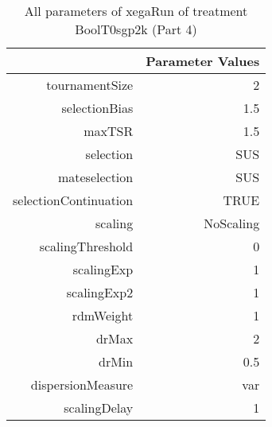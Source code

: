 \begin{table}[ht]
\centering
\begin{tabular}{rr}
  \hline
 & Parameter Values \\ 
  \hline
tournamentSize & 2 \\ 
  selectionBias & 1.5 \\ 
  maxTSR & 1.5 \\ 
  selection & SUS \\ 
  mateselection & SUS \\ 
  selectionContinuation & TRUE \\ 
  scaling & NoScaling \\ 
  scalingThreshold & 0 \\ 
  scalingExp & 1 \\ 
  scalingExp2 & 1 \\ 
  rdmWeight & 1 \\ 
  drMax & 2 \\ 
  drMin & 0.5 \\ 
  dispersionMeasure & var \\ 
  scalingDelay & 1 \\ 
   \hline
\end{tabular}
\caption{ All parameters of xegaRun of treatment BoolT0sgp2k 
 (Part 4)} 
\end{table}
